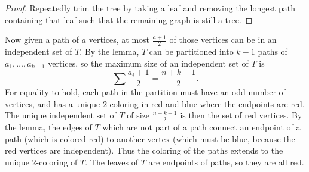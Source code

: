 \begin{proof}
  Repeatedly trim the tree by taking a leaf and removing the longest path
  containing that leaf such that the remaining graph is still a tree.
\end{proof}

Now given a path of $a$ vertices, at most $\frac{a+1}{2}$ of those vertices can
be in an independent set of $T$. By the lemma, $T$ can be partitioned into $k-1$
paths of $a_1, \dots, a_{k-1}$ vertices, so the maximum size of an independent
set of $T$ is
\[\sum \frac{a_i+1}{2}=\frac{n+k-1}{2}.\]
For equality to hold, each path in the partition must have an odd number of
vertices, and has a unique $2$-coloring in red and blue where the endpoints are
red. The unique independent set of $T$ of size $\frac{n+k-1}{2}$ is then the set of red
vertices. By the lemma, the edges of $T$ which are not part of a path connect an
endpoint of a path (which is colored red) to another vertex (which must be blue,
because the red vertices are independent). Thus the coloring of the paths
extends to the unique $2$-coloring of $T$. The leaves of $T$ are endpoints of
paths, so they are all red.
